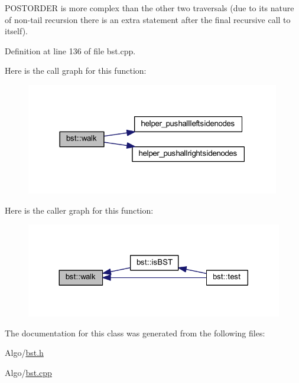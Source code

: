 P\-O\-S\-T\-O\-R\-D\-E\-R is more complex than the other two traversals (due to its nature of non-\/tail recursion there is an extra statement after the final recursive call to itself). 



Definition at line 136 of file bst.\-cpp.



Here is the call graph for this function\-:
\nopagebreak
\begin{figure}[H]
\begin{center}
\leavevmode
\includegraphics[width=314pt]{classbst_a9e8eceb111915919599c147e2d3b9fb0_cgraph}
\end{center}
\end{figure}




Here is the caller graph for this function\-:
\nopagebreak
\begin{figure}[H]
\begin{center}
\leavevmode
\includegraphics[width=324pt]{classbst_a9e8eceb111915919599c147e2d3b9fb0_icgraph}
\end{center}
\end{figure}




The documentation for this class was generated from the following files\-:\begin{DoxyCompactItemize}
\item 
Algo/\hyperlink{bst_8h}{bst.\-h}\item 
Algo/\hyperlink{bst_8cpp}{bst.\-cpp}\end{DoxyCompactItemize}
